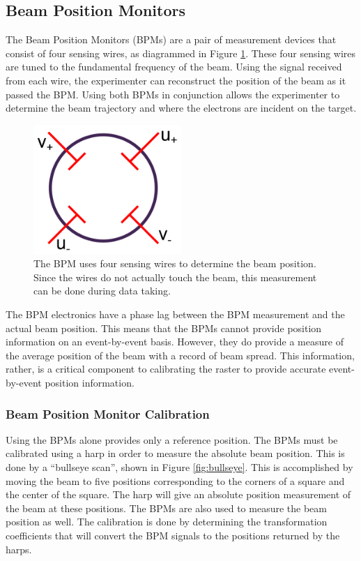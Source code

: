 \subsection{Beam Position Monitors}

The Beam Position Monitors (BPMs) are a pair of measurement devices that consist of four sensing wires, as diagrammed in Figure \ref{fig:bpm}. These four sensing wires are tuned to the fundamental frequency of the beam. Using the signal received from each wire, the experimenter can reconstruct the position of the beam as it passed the BPM. Using both BPMs in conjunction allows the experimenter to determine the beam trajectory and where the electrons are incident on the target.

\begin{figure}[h]
\begin{center}
	\includegraphics[width=0.5\textwidth]{./setup/fig/bpm.png}
	\caption{The BPM uses four sensing wires to determine the beam position. Since the wires do not actually touch the beam, this measurement can be done during data taking.\cite{harp_schem}}
	\label{fig:bpm}
\end{center}
\end{figure}

The BPM electronics have a phase lag between the BPM measurement and the actual beam position. This means that the BPMs cannot provide position information on an event-by-event basis. However, they do provide a measure of the average position of the beam with a record of beam spread. This information, rather, is a critical component to calibrating the raster to provide accurate event-by-event position information.

\subsubsection{Beam Position Monitor Calibration}

Using the BPMs alone provides only a reference position. The BPMs must be calibrated using a harp in order to measure the absolute beam position. This is done by a ``bullseye scan'', shown in Figure \ref{fig:bullseye}. This is accomplished by moving the beam to five positions corresponding to the corners of a square and the center of the square. The harp will give an absolute position measurement of the beam at these positions. The BPMs are also used to measure the beam position as well. The calibration is done by determining the transformation coefficients that will convert the BPM signals to the positions returned by the harps.

